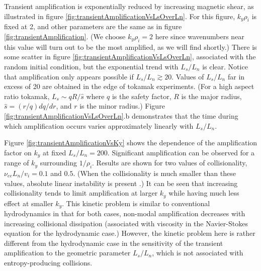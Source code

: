 \documentclass[12pt,superscriptaddress]{revtex4}
\newcommand{\nuee}{\nu_{ee}}
\begin{document}
Transient amplification is exponentially reduced by increasing magnetic shear,
as illustrated in figure \ref{fig:transientAmplificationVsLsOverLn}.
For this figure, $k_y \rho_i$ is fixed at 2, and other parameters
are the same as in figure \ref{fig:transientAmplification}.
(We choose $k_y \rho_i=2$ here since
wavenumbers near this value will turn out to be the most
amplified, as we will find shortly.)
There is some scatter in figure \ref{fig:transientAmplificationVsLsOverLn}, associated with the random initial condition,
but the exponential trend with $L_s/L_n$ is clear.
Notice that amplification only appears possible if $L_s/L_n \gtrsim 20$.
Values of $L_s/L_n$ far in excess of 20 are obtained in the edge of tokamak experiments.
(For a high aspect ratio tokamak, $L_s \sim qR/\hat{s}$ where $q$ is the safety factor, $R$ is
the major radius, $\hat{s} = (r/q) dq/dr$, and $r$ is the minor radius.)
Figure \ref{fig:transientAmplificationVsLsOverLn}.b demonstrates that the time during which amplification occurs
varies approximately linearly with $L_s/L_n$.

Figure \ref{fig:transientAmplificationVsKy} shows the dependence
of the amplification factor on $k_y$ at fixed $L_s/L_n = 200$.
Significant amplification can be observed for a range of $k_y$ surrounding
$1/\rho_i$.
Results are shown for two values of collisionality,
$\nuee L_n / v_i = 0.1$ and $0.5$.
(When the collisionality is much smaller than these values,
absolute linear instability is present \cite{usUniversalInstability}.)
It can be seen that increasing collisionality tends to limit amplification
at larger $k_y$ while having much less effect at smaller $k_y$.
This kinetic problem is similar to conventional hydrodynamics in that for both cases, non-modal amplification
decreases with increasing collisional dissipation (associated with viscosity in the Navier-Stokes equation
for the hydrodynamic case.)
However, the kinetic problem here is rather different
from the hydrodynamic case in the sensitivity of the transient amplification
to the geometric parameter $L_s/L_n$,
which is not associated with entropy-producing collisions.
\end{document}
